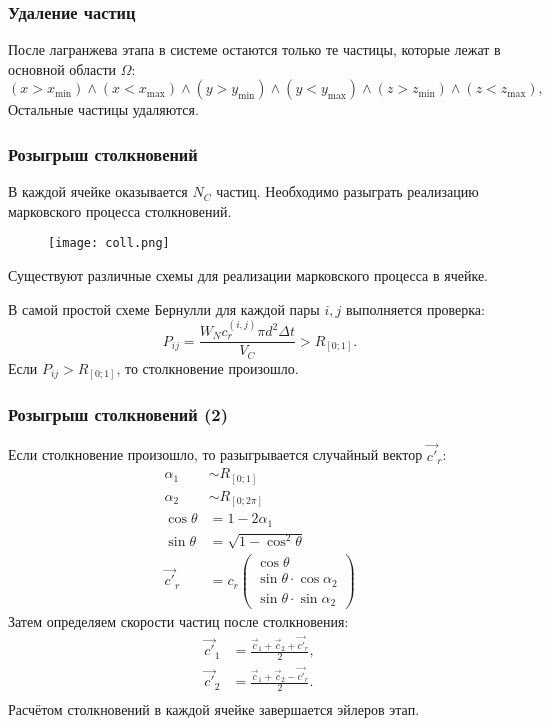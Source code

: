 \documentclass[onlymath]{beamer}
\newcommand\unif[2]{R_{[{#1};{#2}]}}
\newcommand{\ts}{\Delta t}
\newcommand{\statw}{W_N}
\newcommand\dom{\Omega}
\begin{document}
\begin{frame}
  \frametitle{Удаление частиц}
  После лагранжева этапа в системе остаются только те частицы, которые
  лежат в основной области $\dom$:
  \begin{equation*}
    (x > x_{\min}) \land (x < x_{\max}) \land (y > y_{\min}) \land
    (y < y_{\max}) \land (z > z_{\min}) \land (z < z_{\max}),
  \end{equation*}
  Остальные частицы удаляются.
\end{frame}

\begin{frame}
  \frametitle{Розыгрыш столкновений}
  В каждой ячейке оказывается $N_C$ частиц. Необходимо разыграть
  реализацию марковского процесса столкновений.
  \begin{figure}[!h]
    \centering
    \texttt{[image: coll.png]}
  \end{figure}
  
  Существуют различные схемы для реализации марковского процесса в
  ячейке.

  В самой простой схеме Бернулли для каждой пары $i, j$ выполняется проверка:
  \begin{equation*}
    P_{ij} = \frac{\statw c_r^{(i,j)}\pi d^2\ts}{V_C} > \unif{0}{1}.
  \end{equation*}
  Если $P_{ij} > \unif{0}{1}$, то столкновение произошло.
\end{frame}

\begin{frame}
  \frametitle{Розыгрыш столкновений (2)}
  Если столкновение произошло, то разыгрывается случайный вектор
  $\vec{c'}_r$:
  \begin{align*}
    \alpha_1 &\sim \unif{0}{1}\\
    \alpha_2 &\sim \unif{0}{2\pi}\\
    \cos\theta &= 1 - 2\alpha_1\\
    \sin\theta &= \sqrt{1 - \cos^2\theta}\\
    \vec{c'}_r &= c_r \begin{pmatrix}
      \cos\theta\\
      \sin\theta\cdot \cos\alpha_2\\
      \sin\theta\cdot \sin\alpha_2
    \end{pmatrix}
  \end{align*}
Затем определяем скорости частиц после столкновения:
\begin{equation}
  \label{eq:postcoll-velocities}
  \begin{aligned}
    \vec{c'}_1 &= \frac{\vec{c}_1 + \vec{c}_2 + \vec{c'}_r}{2},\\
    \vec{c'}_2 &= \frac{\vec{c}_1 + \vec{c}_2 - \vec{c'}_r}{2}.\\
  \end{aligned}
\end{equation}
Расчётом столкновений в каждой ячейке завершается эйлеров этап.
\end{frame}
\end{document}
